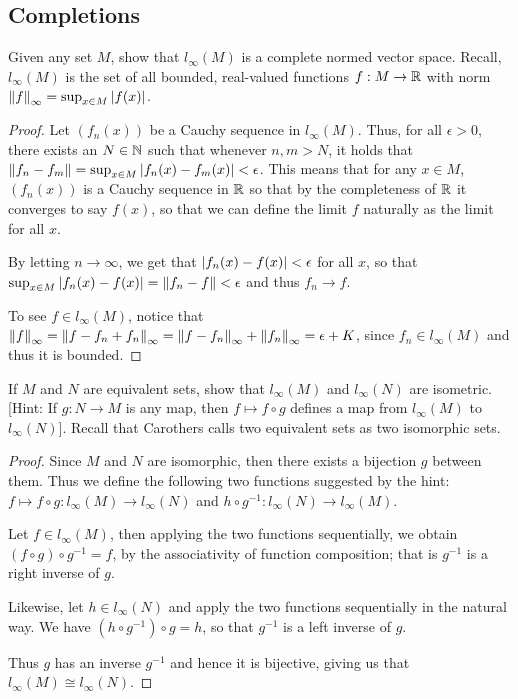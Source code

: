 \subsection{Completions}


\begin{exercise}{44}
Given any set $M$, show that $l_\infty(M)$ is a complete normed vector space.
Recall, $l_\infty(M)$ is the set of all bounded, real-valued functions $f:M\to\mathbb{R}$ with norm $\left\lVert f\right\rVert_\infty=\sup_{x\in M}\left\lvert f(x)\right\rvert$.
\end{exercise}
\begin{proof}
Let $(f_n(x))$ be a Cauchy sequence in $l_\infty(M)$.
Thus, for all $\epsilon>0$, there exists an $N\in\mathbb{N}$ such that whenever $n,m>N$, it holds that $\left\lVert f_n-f_m\right\rVert = \sup_{x\in M}\left\lvert f_n(x)-f_m(x)\right\rvert < \epsilon$.
This means that for any $x\in M$, $(f_n(x))$ is a Cauchy sequence in $\mathbb{R}$ so that by the completeness of $\mathbb{R}$ it converges to say $f(x)$, so that we can define the limit $f$ naturally as the limit for all $x$.

By letting $n\to\infty$, we get that $\left\lvert f_n(x)-f(x)\right\rvert<\epsilon$ for all $x$, so that $\sup_{x\in M}\left\lvert f_n(x)-f(x)\right\rvert = \left\lVert f_n-f\right\rVert < \epsilon$ and thus $f_n\to f$.

To see $f\in l_\infty(M)$, notice that $\left\lVert f\right\rVert_\infty = \left\lVert f-f_n+f_n\right\rVert_\infty = \left\lVert f-f_n\right\rVert_\infty + \left\lVert f_n\right\rVert_\infty = \epsilon + K$, since $f_n\in l_\infty(M)$ and thus it is bounded.
\end{proof} 

\begin{exercise}{45}
If $M$ and $N$ are equivalent sets, show that $l_\infty(M)$ and $l_\infty(N)$ are isometric.
[Hint: If $g:N\to M$ is any map, then $f\mapsto f\circ g$ defines a map from $l_\infty(M)$ to $l_\infty(N)$].
Recall that Carothers calls two equivalent sets as two isomorphic sets.
\end{exercise}
\begin{proof}
Since $M$ and $N$ are isomorphic, then there exists a bijection $g$ between them. 
Thus we define the following two functions suggested by the hint: $f\mapsto f\circ g: l_\infty(M) \to l_\infty(N)$ and $h\circ g^{-1}: l_\infty(N) \to l_\infty(M)$.

Let $f\in l_\infty(M)$, then applying the two functions sequentially, we obtain $(f\circ g) \circ g^{-1} = f$, by the associativity of function composition;
that is $g^{-1}$ is a right inverse of $g$.

Likewise, let $h\in l_\infty(N)$ and apply the two functions sequentially in the natural way.
We have $(h\circ g^{-1})\circ g = h$, so that $g^{-1}$ is a left inverse of $g$.

Thus $g$ has an inverse $g^{-1}$ and hence it is bijective, giving us that $l_\infty(M)\cong l_\infty(N)$.
\end{proof} 

